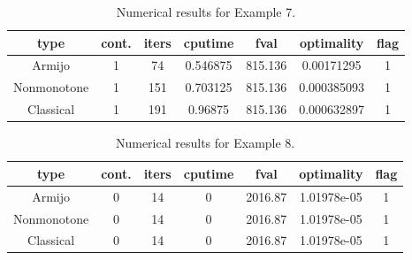 \documentclass[a4paper]{article}
\newcommand{\mr}{\mathbb{R}}
\newcommand{\co}[1]{{\con{#1}}}
\begin{document}


\begin{table}[p]
  \centering
  \begin{tabular}{cc|ccccc}
    \hline
    type & cont. & iters & cputime & 
    fval & optimality & flag \\ \hline
    Armijo & 1 & 74 & 0.546875 & 815.136 & 0.00171295 & 1 \\
    Nonmonotone & 1 & 151 & 0.703125 & 815.136 & 0.000385093 & 1 \\
    Classical & 1 & 191 & 0.96875 & 815.136 & 0.000632897 & 1 \\
    \hline
  \end{tabular}
  \caption{Numerical results for Example 7.}
  \label{tab7}
\end{table}
  
  
  
  
  
  
  \begin{table}[p]
    \centering
    \begin{tabular}{cc|ccccc}
      \hline
      type & cont. & iters & cputime & 
      fval & optimality & flag \\ \hline
      Armijo & 0 & 14 & 0 & 2016.87 & 1.01978e-05 & 1 \\
      Nonmonotone & 0 & 14 & 0 & 2016.87 & 1.01978e-05 & 1 \\
      Classical & 0 & 14 & 0 & 2016.87 & 1.01978e-05 & 1 \\
      \hline
    \end{tabular}
    \caption{Numerical results for Example 8.}
    \label{tab8}
  \end{table}
\end{document}
